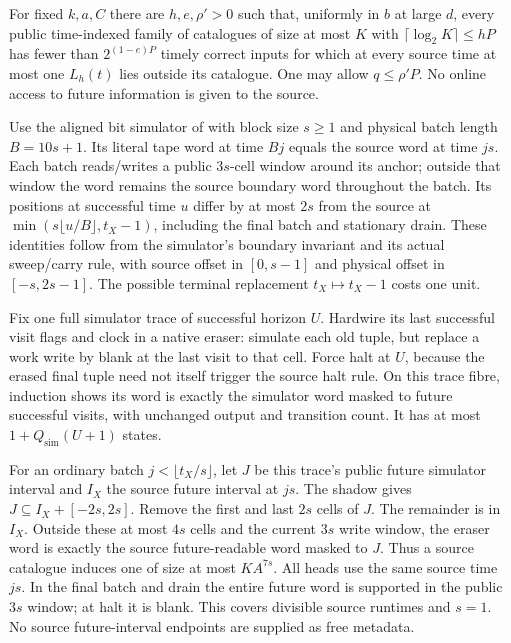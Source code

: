 \begin{theorem}\label{thm:live-catalogue}
\notformalized
For fixed $k,a,C$ there are $h,e,\rho'>0$ such that, uniformly in $b$ at
large $d$, every public time-indexed family of catalogues of size at most
$K$ with $\lceil\log_2K\rceil\le hP$ has fewer than $2^{(1-e)P}$ timely
correct inputs for which at every source time at most one $L_h(t)$ lies
outside its catalogue. One may allow $q\le\rho'P$. No online access to
future information is given to the source.
\end{theorem}
\begin{informalproof}
Use the aligned bit simulator of \cite{HighRateStorage2026} with block size
$s\ge1$ and physical batch length $B=10s+1$. Its literal tape word at
time $Bj$ equals the source word at time $js$. Each batch reads/writes a
public $3s$-cell window around its anchor; outside that window the word remains
the source boundary word throughout the batch. Its positions at successful
time $u$ differ by at most $2s$ from the source at
$\min(s\lfloor u/B\rfloor,t_X-1)$, including the final batch and stationary
drain. These identities follow from the simulator's boundary invariant and
its actual sweep/carry rule, with source offset in $[0,s-1]$ and physical
offset in $[-s,2s-1]$. The possible terminal replacement $t_X\mapsto t_X-1$
costs one unit.

Fix one full simulator trace of successful horizon $U$. Hardwire its last
successful visit flags and clock in a native eraser: simulate each old tuple,
but replace a work write by blank at the last visit to that cell. Force halt
at $U$, because the erased final tuple need not itself trigger the source
halt rule. On this trace fibre, induction shows its word is exactly the
simulator word masked to future successful visits, with unchanged output and
transition count. It has at most $1+Q_{\mathrm{sim}}(U+1)$ states.

For an ordinary batch $j<\lfloor t_X/s\rfloor$, let $J$ be this trace's
public future simulator interval and $I_X$ the source future interval at $js$.
The shadow gives $J\subseteq I_X+[-2s,2s]$. Remove the first and last $2s$
cells of $J$. The remainder is in $I_X$. Outside these at most $4s$ cells
and the current $3s$ write window, the eraser word is exactly the source
future-readable word masked to $J$. Thus a source catalogue induces one of
size at most $KA^{7s}$. All heads use the same source time $js$. In the final
batch and drain the entire future word is supported in the public $3s$
window; at halt it is blank. This covers divisible source runtimes and $s=1$.
No source future-interval endpoints are supplied as free metadata.


\end{informalproof}
